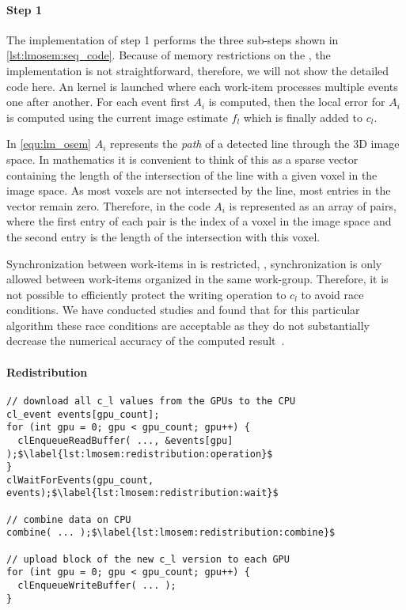 \paragraph{Step 1}
The implementation of step 1 performs the three sub-steps shown in \autoref{lst:lmosem:seq_code}.
Because of memory restrictions on the \GPU, the \OpenCL implementation is not straightforward, therefore, we will not show the detailed code here.
An \OpenCL kernel is launched where each work-item processes multiple events one after another.
For each event first $A_i$ is computed, then the local error for $A_i$ is computed using the current image estimate $f_l$ which is finally added to $c_l$.

In \autoref{equ:lm_osem} $A_i$ represents the \emph{path} of a detected line through the 3D image space.
In mathematics it is convenient to think of this as a sparse vector containing the length of the intersection of the line with a given voxel in the image space.
As most voxels are not intersected by the line, most entries in the vector remain zero.
Therefore, in the \OpenCL code $A_i$ is represented as an array of pairs, where the first entry of each pair is the index of a voxel in the image space and the second entry is the length of the intersection with this voxel.

Synchronization between work-items in \OpenCL is restricted, \ie, synchronization is only allowed between work-items organized in the same work-group.
Therefore, it is not possible to efficiently protect the writing operation to $c_l$ to avoid race conditions.
We have conducted studies and found that for this particular algorithm these race conditions are acceptable as they do not substantially decrease the numerical accuracy of the computed result~\cite{SchellmannGoMeKoScWuBu2009}.


\paragraph{Redistribution}

\begin{lstlisting}[float,
  caption={\OpenCL pseudocode for the redistribution phase},
  label={lst:lmosem:redistribution}]
// download all c_l values from the GPUs to the CPU
cl_event events[gpu_count];
for (int gpu = 0; gpu < gpu_count; gpu++) {
  clEnqueueReadBuffer( ..., &events[gpu] );$\label{lst:lmosem:redistribution:operation}$
}
clWaitForEvents(gpu_count, events);$\label{lst:lmosem:redistribution:wait}$

// combine data on CPU
combine( ... );$\label{lst:lmosem:redistribution:combine}$

// upload block of the new c_l version to each GPU
for (int gpu = 0; gpu < gpu_count; gpu++) {
  clEnqueueWriteBuffer( ... );
}
\end{lstlisting}

